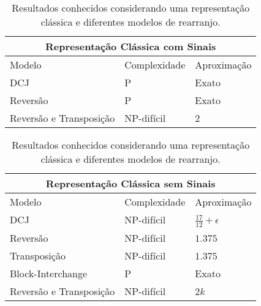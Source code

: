 \begin{table}[!htb]
  \caption[Resultados conhecidos considerando uma representação clássica e diferentes modelos de rearranjo.]{Resultados conhecidos considerando uma representação clássica e diferentes modelos de rearranjo.}
  \label{table:XZPFGPAM}
  \centering
  \begin{tabular}{|p{8cm}|p{3cm}|p{3cm}|}
    \hline
    \multicolumn{3}{|c|}{Representação Clássica com Sinais}                                                                      \\ \hline
    Modelo                  & Complexidade                                 & Aproximação                                         \\ \hline
    DCJ                     & P~\cite{2005-yancopoulos-etal}               & Exato~\cite{2005-yancopoulos-etal}                  \\ \hline
    Reversão                & P~\cite{1999-hannenhalli-pevzner}            & Exato~\cite{1999-hannenhalli-pevzner}               \\ \hline
    Reversão e Transposição & NP-difícil~\cite{2019b-oliveira-etal}        & $2$~\cite{1998-walter-etal}                         \\ \hline
  \end{tabular}

  \hfill \break

  \begin{tabular}{|p{8cm}|p{3cm}|p{3cm}|}
    \hline
    \multicolumn{3}{|c|}{Representação Clássica sem Sinais}                                                                      \\ \hline
    Modelo                  & Complexidade                                 & Aproximação                                         \\ \hline
    DCJ                     & NP-difícil~\cite{2013-chen}                  & $\frac{17}{12}+\epsilon$~\cite{2013-chen}           \\ \hline
    Reversão                & NP-difícil~\cite{1999-caprara}               & $1.375$~\cite{2002-berman-etal}                     \\ \hline
    Transposição            & NP-difícil~\cite{2012-bulteau-etal}          & $1.375$~\cite{2006-elias-hartman,2022-silva-etal}   \\ \hline
    Block-Interchange       & P~\cite{1996-christie}                       & Exato~\cite{1996-christie}                          \\ \hline
    Reversão e Transposição & NP-difícil~\cite{2019b-oliveira-etal}        & $2k$~\cite{2008-rahman-etal,2013-chen}              \\ \hline
  \end{tabular}
\end{table}